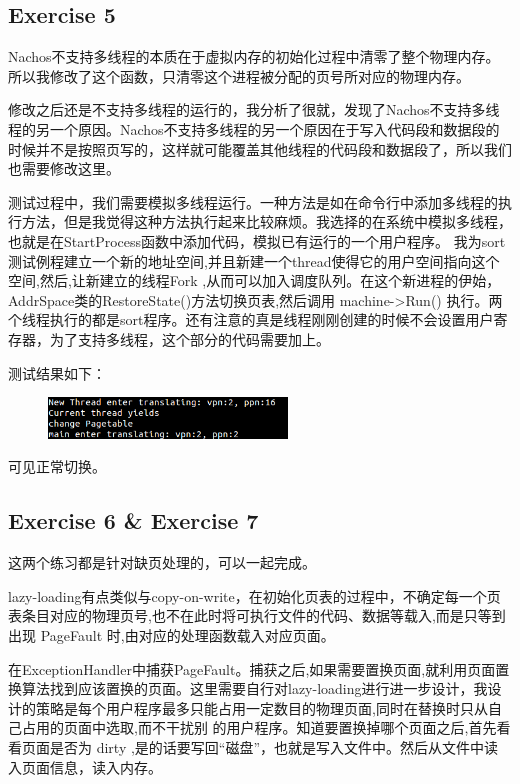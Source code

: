 \documentclass[nofonts]{ctexart}
\begin{document}
\subsection*{Exercise 5}
Nachos不支持多线程的本质在于虚拟内存的初始化过程中清零了整个物理内存。所以我修改了这个函数，只清零这个进程被分配的页号所对应的物理内存。

修改之后还是不支持多线程的运行的，我分析了很就，发现了Nachos不支持多线程的另一个原因。Nachos不支持多线程的另一个原因在于写入代码段和数据段的时候并不是按照页写的，这样就可能覆盖其他线程的代码段和数据段了，所以我们也需要修改这里。

测试过程中，我们需要模拟多线程运行。一种方法是如在命令行中添加多线程的执行方法，但是我觉得这种方法执行起来比较麻烦。我选择的在系统中模拟多线程，也就是在StartProcess函数中添加代码，模拟已有运行的一个用户程序。
我为sort测试例程建立一个新的地址空间,并且新建一个thread使得它的用户空间指向这个空间,然后,让新建立的线程Fork ,从而可以加入调度队列。在这个新进程的伊始，AddrSpace类的RestoreState()方法切换页表,然后调用 machine->Run() 执行。两个线程执行的都是sort程序。还有注意的真是线程刚刚创建的时候不会设置用户寄存器，为了支持多线程，这个部分的代码需要加上。

测试结果如下：

\begin{figure}[h!]
\includegraphics[width=2.5in]{mult.png}
\end{figure}
可见正常切换。

\subsection*{Exercise 6 \& Exercise 7}
这两个练习都是针对缺页处理的，可以一起完成。

lazy-loading有点类似与copy-on-write，在初始化页表的过程中，不确定每一个页表条目对应的物理页号,也不在此时将可执行文件的代码、数据等载入,而是只等到出现 PageFault 时,由对应的处理函数载入对应页面。

在ExceptionHandler中捕获PageFault。捕获之后,如果需要置换页面,就利用页面置换算法找到应该置换的页面。这里需要自行对lazy-loading进行进一步设计，我设计的策略是每个用户程序最多只能占用一定数目的物理页面,同时在替换时只从自己占用的页面中选取,而不干扰别
的用户程序。知道要置换掉哪个页面之后,首先看看页面是否为 dirty ,是的话要写回“磁盘”，也就是写入文件中。然后从文件中读入页面信息，读入内存。
\end{document}
